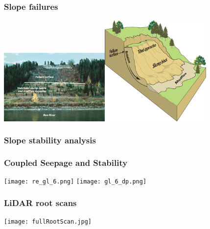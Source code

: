 \documentclass{beamer}
\begin{document}

\begin{frame}
\frametitle{Slope failures}
\includegraphics[width=2.15in]{wildwood_e.jpg}\includegraphics[width=2.15in]{slopes_e.png}
\end{frame}  

\begin{frame}
\frametitle{Slope stability analysis}
\end{frame}  



\begin{frame}
\frametitle{Coupled Seepage and Stability}
\texttt{[image: re\_gl\_6.png]}\hspace{12pt}
\texttt{[image: gl\_6\_dp.png]}
\end{frame}

\begin{frame}
\frametitle{LiDAR root scans}
\texttt{[image: fullRootScan.jpg]}
\end{frame}
\end{document}

